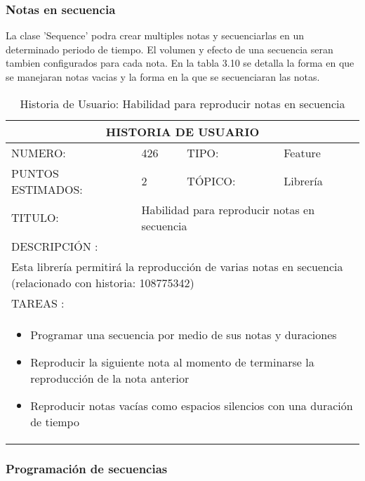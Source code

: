 \subsubsection{Notas en secuencia}

La clase 'Sequence' podra crear multiples notas y secuenciarlas en un
determinado periodo de tiempo. El volumen y efecto de una secuencia
seran tambien configurados para cada nota. En la tabla 3.10 se
detalla la forma en que se manejaran notas vacias y la forma en la
que se secuenciaran las notas.

\begin{table}[h]
\centering
\renewcommand{\arraystretch}{1.4}
\begin{tabular}{|*{4}{l|}}
\hline
\multicolumn{4}{|c|}{HISTORIA DE USUARIO} \\ \hline
NUMERO: & 426 & TIPO: & Feature \\ \hline
PUNTOS ESTIMADOS: & 2 & TÓPICO: & Librería \\ \hline
TITULO: & \multicolumn{3}{|p{7.2cm}|}{Habilidad para reproducir notas en secuencia} \\ \hline
\multicolumn{4}{|l|}{DESCRIPCIÓN : } \\ \hline
\multicolumn{4}{|p{11cm}|}{Esta librería permitirá la reproducción de varias notas en secuencia (relacionado con historia: 108775342)} \\ \hline
\multicolumn{4}{|l|}{TAREAS : } \\ \hline
\multicolumn{4}{|p{11cm}|}{
\begin{minipage}[t]{\hsize}
  \begin{itemize}
    \item Programar una secuencia por medio de sus notas y duraciones
    \item Reproducir la siguiente nota al momento de terminarse la reproducción de la nota anterior
    \item Reproducir notas vacías como espacios silencios con una duración de tiempo
  \end{itemize}
\end{minipage}
} \\ \hline
\end{tabular}
\caption{Historia de Usuario: Habilidad para reproducir notas en secuencia}
\label{tab:Primero}
\end{table}

\subsubsection{Programación de secuencias}

